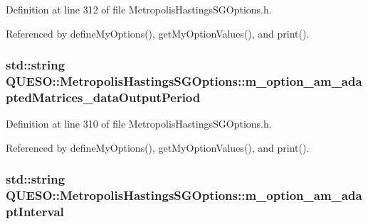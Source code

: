 Definition at line 312 of file Metropolis\-Hastings\-S\-G\-Options.\-h.



Referenced by define\-My\-Options(), get\-My\-Option\-Values(), and print().

\hypertarget{class_q_u_e_s_o_1_1_metropolis_hastings_s_g_options_ac9a445e5def0140cc6cda1288bce2766}{
\subsubsection[{m\-\_\-option\-\_\-am\-\_\-adapted\-Matrices\-\_\-data\-Output\-Period}]{\setlength{\rightskip}{0pt plus 5cm}std\-::string Q\-U\-E\-S\-O\-::\-Metropolis\-Hastings\-S\-G\-Options\-::m\-\_\-option\-\_\-am\-\_\-adapted\-Matrices\-\_\-data\-Output\-Period\hspace{0.3cm}{\ttfamily [private]}}}\label{class_q_u_e_s_o_1_1_metropolis_hastings_s_g_options_ac9a445e5def0140cc6cda1288bce2766}


Definition at line 310 of file Metropolis\-Hastings\-S\-G\-Options.\-h.



Referenced by define\-My\-Options(), get\-My\-Option\-Values(), and print().

\hypertarget{class_q_u_e_s_o_1_1_metropolis_hastings_s_g_options_aad5313349ed8553e95b0d867499b4cc9}{
\subsubsection[{m\-\_\-option\-\_\-am\-\_\-adapt\-Interval}]{\setlength{\rightskip}{0pt plus 5cm}std\-::string Q\-U\-E\-S\-O\-::\-Metropolis\-Hastings\-S\-G\-Options\-::m\-\_\-option\-\_\-am\-\_\-adapt\-Interval\hspace{0.3cm}{\ttfamily [private]}}}\label{class_q_u_e_s_o_1_1_metropolis_hastings_s_g_options_aad5313349ed8553e95b0d867499b4cc9}


